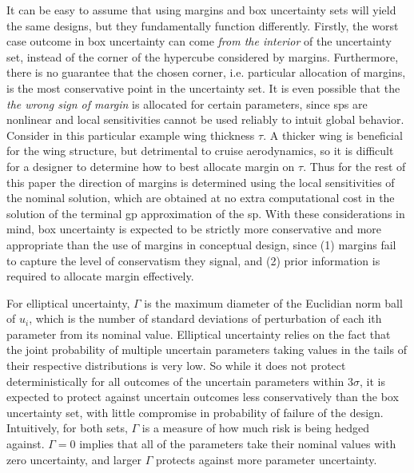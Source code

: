 It can be easy to assume that using margins and box uncertainty sets will yield the same designs,
but they fundamentally function differently.
Firstly, the worst case outcome in box uncertainty can come \emph{from the interior} of the uncertainty
set, instead of the corner of the hypercube considered
by margins. Furthermore, there is no guarantee that the chosen corner, i.e. particular
allocation of margins,
is the most conservative point in the uncertainty set.
It is even possible that the \emph{the wrong sign of margin} is allocated for certain parameters,
since \gls{sp}s are nonlinear and local sensitivities cannot be used reliably to intuit global behavior. Consider
in this particular example wing thickness $\tau$.
A thicker wing is beneficial for the wing structure, but detrimental to cruise aerodynamics, so it is difficult
for a designer to determine how to best allocate margin on $\tau$. Thus for the rest
of this paper the direction of margins is determined using the local sensitivities of the nominal solution,
which are obtained at no extra computational cost in the solution of the terminal \gls{gp} approximation of the \gls{sp}.
With these considerations in mind, box uncertainty is expected to be strictly more conservative
and more appropriate than the use of margins
in conceptual design, since (1) margins fail to capture the level of conservatism they signal, and (2) prior
information is required to allocate margin effectively.

For elliptical uncertainty, $\Gamma$ is the maximum diameter of the Euclidian norm
ball of $u_i$, which is the number of standard deviations of perturbation of each
ith parameter from its nominal value.
Elliptical uncertainty relies on the fact that the joint probability of
multiple uncertain parameters taking values in the tails of their respective distributions is
very low. So while it does not protect deterministically for all outcomes of the uncertain
parameters within $3\sigma$, it is expected to protect against uncertain outcomes
less conservatively than the box uncertainty set, with little compromise in probability of failure
of the design.
Intuitively, for both sets, $\Gamma$ is a measure of how much risk is being
hedged against. $\Gamma = 0$
implies that all of the parameters take their nominal values with zero uncertainty,
and larger $\Gamma$ protects against more parameter uncertainty.

